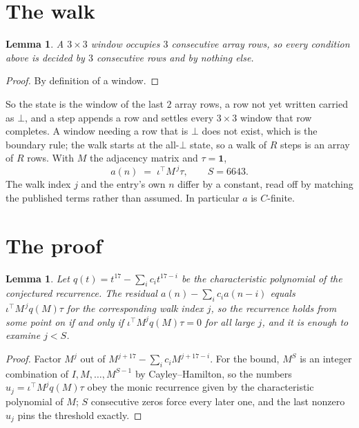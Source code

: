 \documentclass[11pt,a4paper]{article}
\theoremstyle{plain}
\newtheorem{lemma}[theorem]{Lemma}
\theoremstyle{definition}
\begin{document}
\section{The walk}

\begin{lemma}\label{lem:win}
A $3\times3$ window occupies $3$ consecutive array rows, so every condition above is
decided by $3$ consecutive rows and by nothing else.
\end{lemma}

\begin{proof}
By definition of a window.
\end{proof}

So the state is the window of the last $2$ array rows, a row not yet written carried as
$\bot$, and a step appends a row and settles every $3\times3$ window that row completes. A
window needing a row that is $\bot$ does not exist, which is the boundary rule; the walk starts
at the all-$\bot$ state, so a walk of $R$ steps is an array of $R$ rows. With $M$ the adjacency
matrix and $\tau=\mathbf{1}$,
\[
a(n)\;=\;\iota^{\!\top}M^{\,j}\tau ,\qquad S=6643.
\]
The walk index $j$ and the entry's own $n$ differ by a constant, read off by matching the
published terms rather than assumed. In particular $a$ is $C$-finite.

\section{The proof}

\begin{lemma}\label{lem:crit}
Let $q(t)=t^{17}-\sum_i c_it^{17-i}$ be the characteristic polynomial of the
conjectured recurrence. The residual $a(n)-\sum_ic_ia(n-i)$ equals
$\iota^{\!\top}M^{\,j}q(M)\tau$ for the corresponding walk index $j$, so the recurrence
holds from some point on if and only if $\iota^{\!\top}M^{j}q(M)\tau=0$ for all large $j$,
and it is enough to examine $j<S$.
\end{lemma}

\begin{proof}
Factor $M^{j}$ out of $M^{j+17}-\sum_ic_iM^{j+17-i}$. For the bound, $M^{S}$
is an integer combination of $I,M,\dots,M^{S-1}$ by Cayley--Hamilton, so the numbers
$u_j=\iota^{\!\top}M^{j}q(M)\tau$ obey the monic recurrence given by the characteristic
polynomial of $M$; $S$ consecutive zeros force every later one, and the last nonzero $u_j$
pins the threshold exactly.
\end{proof}
\end{document}
